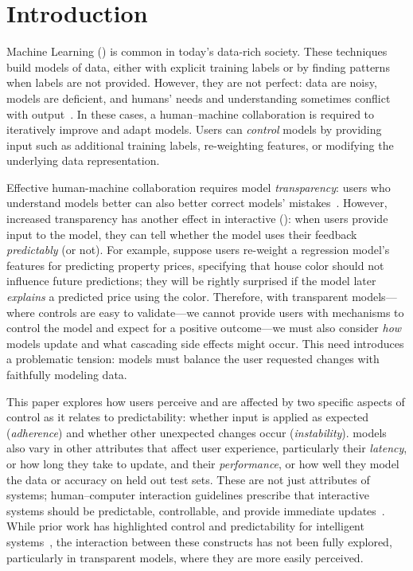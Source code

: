\section{Introduction}

Machine Learning () is common in today's data-rich society.
These techniques build models of data, either with explicit training
labels or by finding patterns when labels are not provided.
However, they are not perfect: data are noisy, models are
deficient, and humans' needs and understanding sometimes conflict with
 output~\cite{amodei2016concrete}.
In these cases, a human--machine collaboration is required to iteratively improve and adapt models.
Users can \textit{control} models by providing input such as additional training labels, re-weighting features, or modifying the underlying data representation.


Effective human-machine collaboration requires model
\textit{transparency}: users who understand models better can also
better correct models'
mistakes~\cite{Kulesza2010ExplanatoryPrograms,
  Rosenthal2010TowardsData}.
However, increased transparency has another effect in interactive 
(): when users provide input to the model, they can tell whether the model uses their feedback
\textit{predictably} (or not).
For example, suppose users re-weight a regression model's features
for predicting property prices, specifying that house color should
not influence future predictions; they will be rightly
surprised if the model later \textit{explains} a predicted price using
the color.
Therefore, with transparent models---where controls are easy to validate---we cannot  provide
users with mechanisms to control the model and expect for a positive
outcome---we must also consider \textit{how} models update and what
cascading side effects might occur. This need introduces a problematic
tension:
 models must balance the user requested changes with faithfully modeling
 data.

This paper explores how users perceive and are affected by two specific aspects of control as it relates to predictability: whether input is applied as expected (\textit{adherence}) and whether other unexpected changes occur (\textit{instability}).  models also vary in other attributes that affect user experience, particularly their \textit{latency}, or how long they take to update, and their \textit{performance}, or how well they model the data or accuracy on held out test sets. These are not just attributes of  systems; human--computer interaction guidelines prescribe that interactive systems should be predictable, controllable, and provide immediate updates~\cite{Hoekman2007DesigningDesign, Shneiderman1996TheVisualizations}. While prior work has highlighted control and predictability for intelligent systems~\cite{Hook2000StepsReal}, the interaction between these constructs has not been fully explored, particularly in transparent models, where they are more easily perceived.

